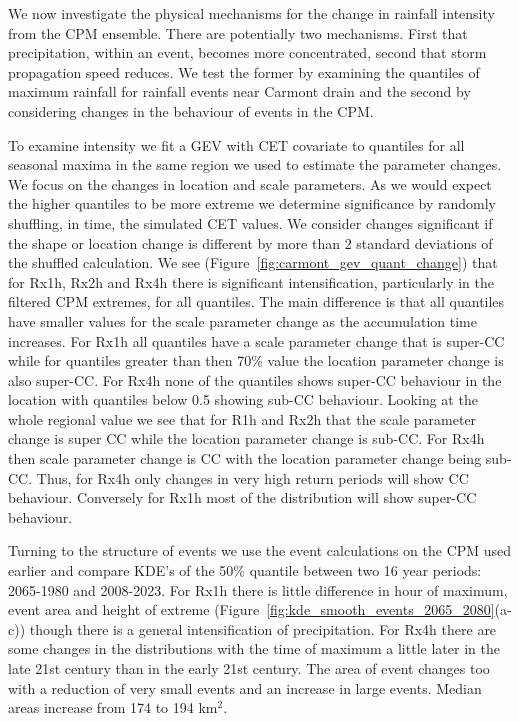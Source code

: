 \documentclass[11pt,a4paper]{article}
\begin{document}
We now investigate the physical mechanisms for the change in rainfall intensity from the CPM ensemble. There are potentially two mechanisms. First that precipitation, within an event, becomes more concentrated, second that storm propagation speed reduces. We test the former by examining  the quantiles of maximum rainfall for  rainfall events near Carmont drain and the second by  considering changes in the behaviour of events in the CPM. 

To examine intensity we fit a GEV with CET covariate to quantiles for all seasonal maxima in the same region we used to estimate the parameter changes. We focus on the changes in location and scale parameters. As we would expect the higher quantiles to be more extreme we determine significance by randomly shuffling, in time, the simulated CET values. We consider  changes significant if the shape or location change is different by more than 2 standard deviations of the shuffled calculation. We see (Figure~\ref{fig:carmont_gev_quant_change}) that for Rx1h, Rx2h and Rx4h there is significant intensification, particularly in the filtered CPM extremes, for all quantiles.  The main difference is that all quantiles have smaller values for the scale parameter change as the accumulation time increases.  For Rx1h all quantiles have a scale parameter change that is super-CC while for quantiles greater than then 70\% value the location parameter change is also super-CC.  For Rx4h none of the quantiles shows super-CC behaviour in the location with quantiles below 0.5 showing sub-CC behaviour.  Looking at the whole regional value we see that for R1h and Rx2h that the scale parameter change is  super CC while the location parameter change is sub-CC. For Rx4h then scale parameter change is CC with the location parameter change being sub-CC. Thus, for Rx4h only changes in very high return periods will show CC behaviour. Conversely for Rx1h most of the distribution will show super-CC behaviour. 

 Turning to the structure of events we use the event calculations on the CPM used earlier and compare KDE's of the 50\% quantile between two 16 year periods: 2065-1980 and 2008-2023. For Rx1h  there is little difference in hour of maximum, event area and height of extreme (Figure~\ref{fig:kde_smooth_events_2065_2080}(a-c)) though there is a general intensification of precipitation.  For Rx4h there are some changes in the distributions with the time of maximum a little later in the late 21st century than in the early 21st century.  The area of event changes too with a reduction of very small  events and an increase in large events. Median areas increase from 174  to 194 km$^2$. 
 
\end{document}

